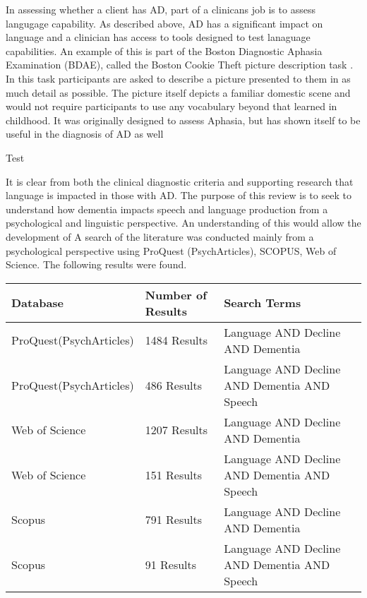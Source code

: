 \documentclass[a4paper]{article}
\begin{document}
\par
In assessing whether a client has AD, part of a clinicans job is to assess langugage capability. As described above, AD has a significant impact on language and a clinician has access to tools designed to test lanaguage capabilities. An example of this is part of the Boston Diagnostic Aphasia Examination (BDAE), called the Boston Cookie Theft picture description task \cite{} . In this task participants are asked to describe a picture presented to them in as much detail as possible. The picture itself depicts a familiar domestic scene and would not require participants to use any vocabulary beyond that learned in childhood. It was originally designed to assess Aphasia, but has shown itself to be useful in the diagnosis of AD as well \cite{GilesPattersonHodges1995}\newline
\par
Test\newline
\par
It is clear from both the clinical diagnostic criteria and supporting research that language is impacted in those with AD. The purpose of this review is to seek to understand how dementia impacts speech and language production from a psychological and linguistic perspective. An understanding of this would allow the development of  A search of the literature was conducted mainly from a psychological perspective using ProQuest (PsychArticles), SCOPUS, Web of Science. The following results were found.

\begin{center}
	\begin{tabular}{ | l | l | l | p{3cm} |}
		\hline
		Database & Number of Results & Search Terms  \\ \hline
		ProQuest(PsychArticles) & 1484 Results & Language AND Decline AND Dementia \\ \hline
		ProQuest(PsychArticles) & 486 Results  & Language AND Decline AND Dementia AND Speech \\ \hline
		Web of Science & 1207 Results  & Language AND Decline AND Dementia   \\ \hline
		Web of Science & 151 Results  & Language AND Decline AND Dementia AND Speech  \\ \hline
		Scopus & 791 Results & Language AND Decline AND Dementia  \\ \hline
		Scopus & 91 Results & Language AND Decline AND Dementia AND Speech   \\ 
		\hline
	\end{tabular}
\end{center}
\end{document}
